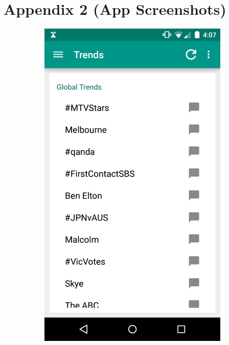 \documentclass[11pt,english,numbers=endperiod,parskip=half]{scrartcl}
\begin{document}
\section{Appendix 2 (App Screenshots)}
  \begin{figure}[H]
    \centering
    \begin{subfigure}{.5\textwidth}
      \centering
      \includegraphics[width=.7\linewidth]{images/ss1.png}
    \end{subfigure}%
    \begin{subfigure}{.5\textwidth}
      \centering

\end{subfigure}
\end{figure}
\end{document}
